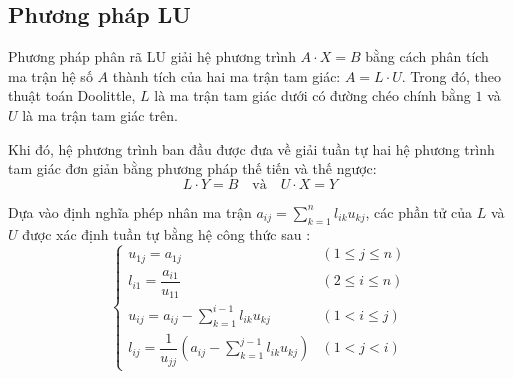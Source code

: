 


\subsection{Phương pháp LU}

Phương pháp phân rã LU giải hệ phương trình $A \cdot X = B$ bằng cách phân tích ma trận hệ số $A$ thành tích của hai ma trận tam giác: $A = L \cdot U$. Trong đó, theo thuật toán Doolittle, $L$ là ma trận tam giác dưới có đường chéo chính bằng $1$ và $U$ là ma trận tam giác trên.

Khi đó, hệ phương trình ban đầu được đưa về giải tuần tự hai hệ phương trình tam giác đơn giản bằng phương pháp thế tiến và thế ngược:
\begin{equation}
L \cdot Y = B \quad \text{và} \quad U \cdot X = Y
\end{equation}

Dựa vào định nghĩa phép nhân ma trận $a_{ij} = \sum_{k=1}^{n} l_{ik} u_{kj}$, các phần tử của $L$ và $U$ được xác định tuần tự bằng hệ công thức sau \cite{dau2026hephuongtrinh}:
\begin{equation}
\begin{cases}
    u_{1j} = a_{1j} & (1 \le j \le n) \\
    l_{i1} = \dfrac{a_{i1}}{u_{11}} & (2 \le i \le n) \\
    u_{ij} = a_{ij} - \sum\limits_{k=1}^{i-1} l_{ik}u_{kj} & (1 < i \le j) \\
    l_{ij} = \dfrac{1}{u_{jj}} \left( a_{ij} - \sum\limits_{k=1}^{j-1} l_{ik}u_{kj} \right) & (1 < j < i)
\end{cases}
\end{equation}

